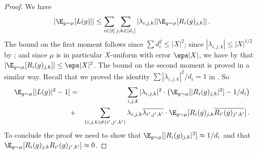 \begin{proof}
We have
$$
|\E_{g \sim \mu} [L(g)]| \le \sum_{i \in [t]} \sum_{j,k \in [d_i]}
|\lambda_{i,j,k}| |\E_{g \sim \mu} [R_i(g)_{j,k}]|\,.
$$
The bound on the first moment follows since $\sum d_i^2
\le |X|^2$; since $|\lambda_{i,j,k}| \le |X|^{1/2}$ by
; and since $\mu$
is in particular $X$-uniform with error $\eps |X|$, we have by
 that $|\E_{g \sim
\mu}[R_i(g)_{j,k}]| \le \eps |X|^2$. The bound on the second moment is
proved in a similar way. Recall that we proved the identity $\sum |\lambda_{i,j,k}|^2/d_i=1$ in
. So
\begin{eqnarray*}
\E_{g \sim \mu} [|L(g)|^2-1] &=& \sum_{i,j,k}
|\lambda_{i,j,k}|^2 \cdot \left(\E_{g \sim \mu}[|R_i(g)_{j,k}|^2] - 1/d_i\right)\\
&+& \sum_{(i,j,k) \ne (i',j',k')} \lambda_{i,j,k}
\overline{\lambda_{i',j',k'}} \cdot
\E_{g \sim \mu}[R_i(g)_{j,k} \overline{R_{i'}(g)_{j',k'}}]\,.
\end{eqnarray*}
To conclude the proof we need to show that $\E_{g \sim
\mu}[|R_i(g)_{j,k}|^2] \approx 1/d_i$ and that $\E_{g \sim
\mu}[R_i(g)_{j,k} R_{i'}(g)_{j',k'}] \approx 0$.


\end{proof}

